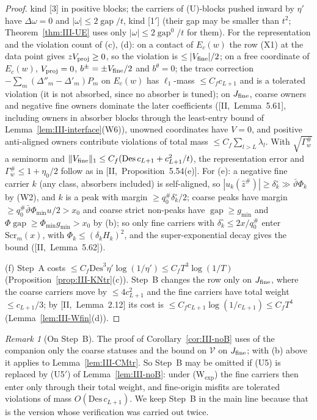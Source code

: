\documentclass[10pt]{amsart}
\theoremstyle{definition}
\theoremstyle{remark}
\newtheorem{remark}[theorem]{Remark}
\newcommand{\gap}{\operatorname{gap}}
\newcommand{\zh}{\hat z}
\begin{document}
\begin{proof}
kind [3] in positive blocks; the carriers of (U)-blocks pushed inward by $\eta'$
have $\Delta\omega=0$ and $|\omega|\le2\gap/t$, kind [1$'$] (their gap may be
smaller than $t^2$; Theorem~\ref{thm:III-UE} uses only $|\omega|\le2\gap^0/t$ for
them).
For the representation and the violation count of (c), (d): on a contact
of $E_c(w)$ the row (X1) at the data point gives $zV_{\rm proj}\ge0$, so the
violation is $\le|V_{\rm fine}|/2$; on a free coordinate of $E_c(w)$,
$V_{\rm proj}=0$, $b^\pm=\pm V_{\rm fine}/2$ and $b^\theta=0$; the trace correction
$-\sum_m(\Delta''_m-\Delta'_m)P_m$ on $E_c(w)$ has $\ell_1$-mass $\le C_fc_{L+1}$
and is a tolerated violation (it is not absorbed, since no absorber is
tuned); on $J_{\rm fine}$, coarse owners and negative fine owners dominate the
later coefficients ([II,~Lemma~5.61], including owners in absorber blocks
through the least-entry bound of Lemma~\ref{lem:III-interface}(W6)), unowned
coordinates have $V=0$, and positive anti-aligned owners contribute
violations of total mass $\le C_f\sum_{l>L}\lambda_l$.  With $\sqrt{\Gamma^\#_w}$ a
seminorm and $\|V_{\rm fine}\|_1\le C_f(\mathrm{Des}\,c_{L+1}+c_{L+1}^2/t)$, the
representation error and $\Gamma^\#_w\le1+\eta_0/2$ follow as in
[II,~Proposition~5.54(e)].  For (e): a negative fine carrier $k$ (any class,
absorbers included) is self-aligned, so $|u_k(\zh^\#)|\ge\delta^\circ_k\gg\bar\vartheta
\Phi_k$ by (W2), and $k$ is a peak with margin $\ge q^\#_0\delta^\circ_k/2$; coarse
peaks have margin $\ge q^\#_0\bar\vartheta\Phi_{\min}u/2>x_0$ and coarse strict
non-peaks have $\gap\ge g_{\min}$ and $\Phi\gap\ge\Phi_{\min}g_{\min}>x_0$ by (b);
so only fine carriers with $\delta^\circ_k\le2x/q^\#_0$ enter $\mathrm{Scr}_m(x)$, with
$\Phi_k\le(\delta_kH_k)^2$, and the super-exponential decay gives the bound
([II,~Lemma~5.62]).

(f) Step~A costs $\le C_f\mathrm{Des}^3\eta'\log(1/\eta')\le C_fT^3\log(1/T)$
(Proposition~\ref{prop:III-KNtr}(c)).  Step~B changes the row only on
$J_{\rm fine}$, where the coarse carriers move by $\le4c_{L+1}^2$ and the fine
carriers have total weight $\le c_{L+1}/3$; by [II,~Lemma~2.12] its cost is
$\le C_fc_{L+1}\log(1/c_{L+1})\le C_fT^4$ (Lemma~\ref{lem:III-Wfin}(d)).
\end{proof}

\begin{remark}[On Step~B]\label{rem:III-stepB}
The proof of Corollary~\ref{cor:III-noB} uses of the companion only the coarse
statuses and the bound on $\mathcal V$ on $J_{\rm fine}$; with (b) above it
applies to Lemma~\ref{lem:III-CMtr}.  So Step~B may be omitted if (U5) is
replaced by (U5$'$) of Lemma~\ref{lem:III-noB}: under (W$_{\exp}$) the fine
carriers then enter only through their total weight, and fine-origin misfits
are tolerated violations of mass $O(\mathrm{Des}\,c_{L+1})$.  We keep Step~B in
the main line because that is the version whose verification was carried out
twice.
\end{remark}
\end{document}
